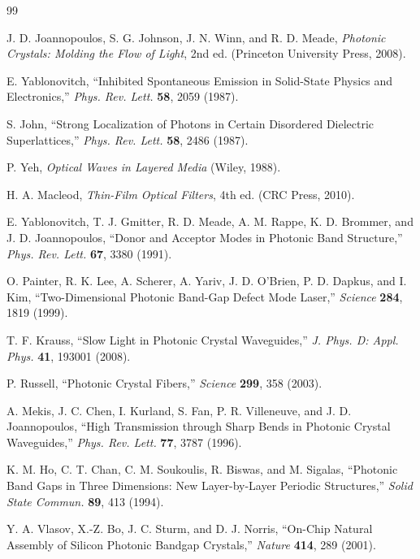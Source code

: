 \documentclass[11pt,a4paper]{article}
\begin{document}
\begin{thebibliography}{99}

J. D. Joannopoulos, S. G. Johnson, J. N. Winn, and R. D. Meade,
\textit{Photonic Crystals: Molding the Flow of Light}, 2nd ed. (Princeton University Press, 2008).

E. Yablonovitch,
``Inhibited Spontaneous Emission in Solid-State Physics and Electronics,''
\textit{Phys. Rev. Lett.} \textbf{58}, 2059 (1987).

S. John,
``Strong Localization of Photons in Certain Disordered Dielectric Superlattices,''
\textit{Phys. Rev. Lett.} \textbf{58}, 2486 (1987).

P. Yeh, \textit{Optical Waves in Layered Media} (Wiley, 1988).

H. A. Macleod, \textit{Thin-Film Optical Filters}, 4th ed. (CRC Press, 2010).

E. Yablonovitch, T. J. Gmitter, R. D. Meade, A. M. Rappe, K. D. Brommer, and J. D. Joannopoulos,
``Donor and Acceptor Modes in Photonic Band Structure,''
\textit{Phys. Rev. Lett.} \textbf{67}, 3380 (1991).

O. Painter, R. K. Lee, A. Scherer, A. Yariv, J. D. O'Brien, P. D. Dapkus, and I. Kim,
``Two-Dimensional Photonic Band-Gap Defect Mode Laser,''
\textit{Science} \textbf{284}, 1819 (1999).

T. F. Krauss,
``Slow Light in Photonic Crystal Waveguides,''
\textit{J. Phys. D: Appl. Phys.} \textbf{41}, 193001 (2008).

P. Russell,
``Photonic Crystal Fibers,''
\textit{Science} \textbf{299}, 358 (2003).

A. Mekis, J. C. Chen, I. Kurland, S. Fan, P. R. Villeneuve, and J. D. Joannopoulos,
``High Transmission through Sharp Bends in Photonic Crystal Waveguides,''
\textit{Phys. Rev. Lett.} \textbf{77}, 3787 (1996).

K. M. Ho, C. T. Chan, C. M. Soukoulis, R. Biswas, and M. Sigalas,
``Photonic Band Gaps in Three Dimensions: New Layer-by-Layer Periodic Structures,''
\textit{Solid State Commun.} \textbf{89}, 413 (1994).

Y. A. Vlasov, X.-Z. Bo, J. C. Sturm, and D. J. Norris,
``On-Chip Natural Assembly of Silicon Photonic Bandgap Crystals,''
\textit{Nature} \textbf{414}, 289 (2001).


\end{thebibliography}
\end{document}
